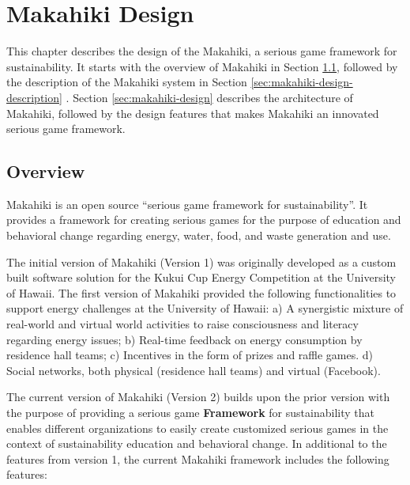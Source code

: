 \chapter{Makahiki Design}
\label{cha:makahiki-design}

This chapter describes the design of the Makahiki, a serious game framework for sustainability. It starts with the overview of Makahiki in Section \ref{sec:makahiki-design-overview}, followed by the description of the Makahiki system in Section \ref{sec:makahiki-design-description}
. Section \ref{sec:makahiki-design}
 describes the architecture of Makahiki, followed by the design features that makes Makahiki an innovated serious game framework.

\section{Overview}
\label{sec:makahiki-design-overview}

Makahiki is an open source ``serious game framework for sustainability''. It provides a framework for creating serious games for the purpose of education and behavioral change regarding energy, water, food, and waste generation and use.

The initial version of Makahiki (Version 1) was originally developed as a custom built software solution \cite{csdl2-11-01} for the Kukui Cup Energy Competition \cite{csdl2-10-08} at the University of Hawaii. The first version of Makahiki provided the following functionalities to support energy challenges at the University of Hawaii: a) A synergistic mixture of real-world and virtual world activities to raise  consciousness and literacy regarding energy issues; b) Real-time feedback on energy consumption by residence hall teams; c) Incentives in the form of prizes and raffle games. d) Social networks, both physical (residence hall teams) and virtual (Facebook).

The current version of Makahiki (Version 2) builds upon the prior version with the purpose of providing a serious game {\bf Framework} for sustainability that enables different organizations to easily create customized serious games in the context of sustainability education and behavioral change. In additional to the features from version 1, the current Makahiki framework includes the following features:

